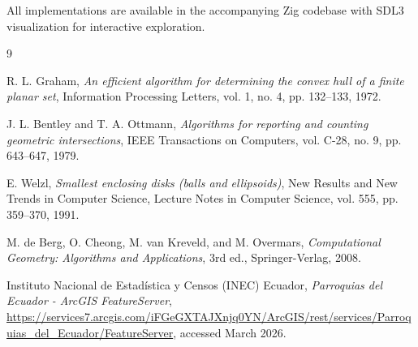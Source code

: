 \documentclass[11pt,a4paper]{article}
\begin{document}
All implementations are available in the accompanying Zig codebase with SDL3 visualization for interactive exploration.

\begin{thebibliography}{9}

R. L. Graham,
\textit{An efficient algorithm for determining the convex hull of a finite planar set},
Information Processing Letters, vol. 1, no. 4, pp. 132--133, 1972.

J. L. Bentley and T. A. Ottmann,
\textit{Algorithms for reporting and counting geometric intersections},
IEEE Transactions on Computers, vol. C-28, no. 9, pp. 643--647, 1979.

E. Welzl,
\textit{Smallest enclosing disks (balls and ellipsoids)},
New Results and New Trends in Computer Science, Lecture Notes in Computer Science, vol. 555, pp. 359--370, 1991.

M. de Berg, O. Cheong, M. van Kreveld, and M. Overmars,
\textit{Computational Geometry: Algorithms and Applications},
3rd ed., Springer-Verlag, 2008.

Instituto Nacional de Estadística y Censos (INEC) Ecuador,
\textit{Parroquias del Ecuador - ArcGIS FeatureServer},
\url{https://services7.arcgis.com/iFGeGXTAJXnjq0YN/ArcGIS/rest/services/Parroquias_del_Ecuador/FeatureServer},
accessed March 2026.

\end{thebibliography}
\end{document}
